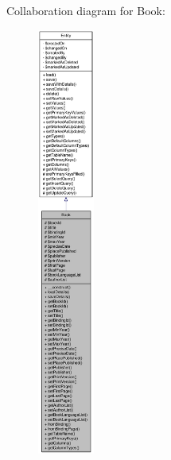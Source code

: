 Collaboration diagram for Book:\nopagebreak
\begin{figure}[H]
\begin{center}
\leavevmode
\includegraphics[height=400pt]{classBook__coll__graph}
\end{center}
\end{figure}
